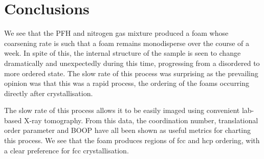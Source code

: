 \documentclass[10pt,a4paper]{article}
\begin{document}


\section{Conclusions}

We see that the PFH and nitrogen gas mixture produced a foam whose coarsening rate is such that a foam remains monodisperse over the course of a week. In spite of this, the internal structure of the sample is seen to change dramatically and unexpectedly during this time, progressing from a disordered to more ordered state. The slow rate of this process was surprising as the prevailing opinion was that this was a rapid process, the ordering of the foams occurring directly after crystallisation.

The slow rate of this process allows it to be easily imaged using convenient lab-based X-ray tomography. From this data, the coordination number, translational order parameter and BOOP have all been shown as useful metrics for charting this process. We see that the foam produces regions of fcc and hcp ordering, with a clear preference for fcc crystallisation. 
\end{document}
